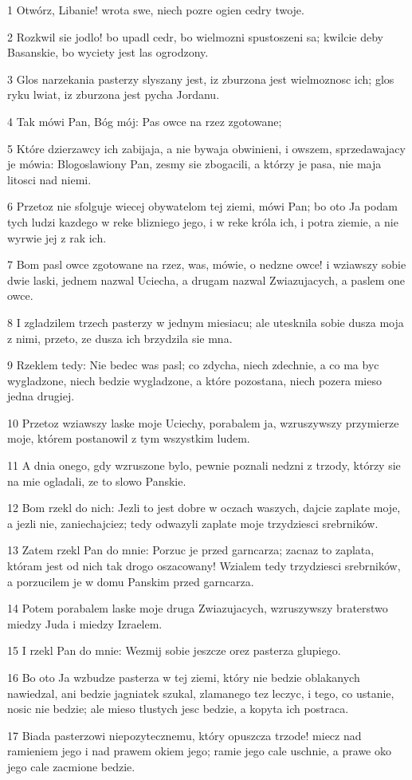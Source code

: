 \par 1 Otwórz, Libanie! wrota swe, niech pozre ogien cedry twoje.
\par 2 Rozkwil sie jodlo! bo upadl cedr, bo wielmozni spustoszeni sa; kwilcie deby Basanskie, bo wyciety jest las ogrodzony.
\par 3 Glos narzekania pasterzy slyszany jest, iz zburzona jest wielmoznosc ich; glos ryku lwiat, iz zburzona jest pycha Jordanu.
\par 4 Tak mówi Pan, Bóg mój: Pas owce na rzez zgotowane;
\par 5 Które dzierzawcy ich zabijaja, a nie bywaja obwinieni, i owszem, sprzedawajacy je mówia: Blogoslawiony Pan, zesmy sie zbogacili, a którzy je pasa, nie maja litosci nad niemi.
\par 6 Przetoz nie sfolguje wiecej obywatelom tej ziemi, mówi Pan; bo oto Ja podam tych ludzi kazdego w reke blizniego jego, i w reke króla ich, i potra ziemie, a nie wyrwie jej z rak ich.
\par 7 Bom pasl owce zgotowane na rzez, was, mówie, o nedzne owce! i wziawszy sobie dwie laski, jednem nazwal Uciecha, a drugam nazwal Zwiazujacych, a paslem one owce.
\par 8 I zgladzilem trzech pasterzy w jednym miesiacu; ale utesknila sobie dusza moja z nimi, przeto, ze dusza ich brzydzila sie mna.
\par 9 Rzeklem tedy: Nie bedec was pasl; co zdycha, niech zdechnie, a co ma byc wygladzone, niech bedzie wygladzone, a które pozostana, niech pozera mieso jedna drugiej.
\par 10 Przetoz wziawszy laske moje Uciechy, porabalem ja, wzruszywszy przymierze moje, którem postanowil z tym wszystkim ludem.
\par 11 A dnia onego, gdy wzruszone bylo, pewnie poznali nedzni z trzody, którzy sie na mie ogladali, ze to slowo Panskie.
\par 12 Bom rzekl do nich: Jezli to jest dobre w oczach waszych, dajcie zaplate moje, a jezli nie, zaniechajciez; tedy odwazyli zaplate moje trzydziesci srebrników.
\par 13 Zatem rzekl Pan do mnie: Porzuc je przed garncarza; zacnaz to zaplata, któram jest od nich tak drogo oszacowany! Wzialem tedy trzydziesci srebrników, a porzucilem je w domu Panskim przed garncarza.
\par 14 Potem porabalem laske moje druga Zwiazujacych, wzruszywszy braterstwo miedzy Juda i miedzy Izraelem.
\par 15 I rzekl Pan do mnie: Wezmij sobie jeszcze orez pasterza glupiego.
\par 16 Bo oto Ja wzbudze pasterza w tej ziemi, który nie bedzie oblakanych nawiedzal, ani bedzie jagniatek szukal, zlamanego tez leczyc, i tego, co ustanie, nosic nie bedzie; ale mieso tlustych jesc bedzie, a kopyta ich postraca.
\par 17 Biada pasterzowi niepozytecznemu, który opuszcza trzode! miecz nad ramieniem jego i nad prawem okiem jego; ramie jego cale uschnie, a prawe oko jego cale zacmione bedzie.

